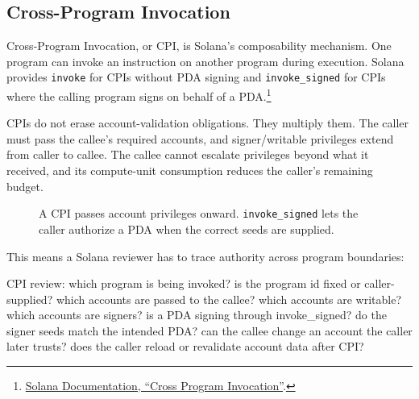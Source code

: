 \subsection{Cross-Program Invocation}

Cross-Program Invocation, or CPI, is Solana's composability mechanism. One program can invoke an instruction on another program during execution. Solana provides \texttt{invoke} for CPIs without PDA signing and \texttt{invoke\_signed} for CPIs where the calling program signs on behalf of a PDA.\footnote{\href{https://solana.com/docs/core/cpi}{Solana Documentation, ``Cross Program Invocation''}.}

CPIs do not erase account-validation obligations. They multiply them. The caller must pass the callee's required accounts, and signer/writable privileges extend from caller to callee. The callee cannot escalate privileges beyond what it received, and its compute-unit consumption reduces the caller's remaining budget.

\begin{figure}[htbp]
\centering
{}
\caption{A CPI passes account privileges onward. \texttt{invoke\_signed} lets the caller authorize a PDA when the correct seeds are supplied.}
\end{figure}

This means a Solana reviewer has to trace authority across program boundaries:

\begin{codeblock}
CPI review:
    which program is being invoked?
    is the program id fixed or caller-supplied?
    which accounts are passed to the callee?
    which accounts are writable?
    which accounts are signers?
    is a PDA signing through invoke_signed?
    do the signer seeds match the intended PDA?
    can the callee change an account the caller later trusts?
    does the caller reload or revalidate account data after CPI?
\end{codeblock}

